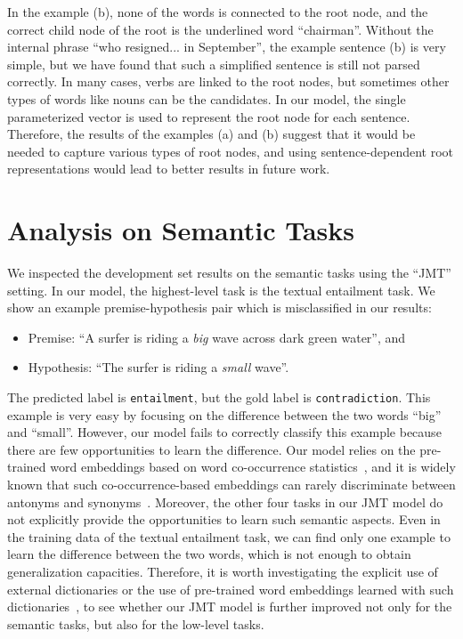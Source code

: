 \documentclass[11pt,a4paper]{article}
\begin{document}
In the example (b), none of the words is connected to the root node, and the correct child node of the root is the underlined word ``chairman''.
Without the internal phrase ``who resigned... in September'', the example sentence (b) is very simple, but we have found that such a simplified sentence is still not parsed correctly.
In many cases, verbs are linked to the root nodes, but sometimes other types of words like nouns can be the candidates.
In our model, the single parameterized vector  is used to represent the root node for each sentence.
Therefore, the results of the examples (a) and (b) suggest that it would be needed to capture various types of root nodes, and using sentence-dependent root representations would lead to better results in future work.

\section{Analysis on Semantic Tasks}
\label{sec:sem_analysis}

We inspected the development set results on the semantic tasks using the ``JMT'' setting.
In our model, the highest-level task is the textual entailment task.
We show an example premise-hypothesis pair which is misclassified in our results:
\begin{itemize}
\item[] Premise: ``A surfer is riding a {\it big} wave across dark green water'', and
\item[] Hypothesis: ``The surfer is riding a {\it small} wave''.
\end{itemize}
The predicted label is {\tt entailment}, but the gold label is {\tt contradiction}.
This example is very easy by focusing on the difference between the two words ``big'' and ``small''.
However, our model fails to correctly classify this example because there are few opportunities to learn the difference.
Our model relies on the pre-trained word embeddings based on word co-occurrence statistics~\citep{mikolov2013word2vec}, and it is widely known that such co-occurrence-based embeddings can rarely discriminate between antonyms and synonyms~\citep{ono2015ant}.
Moreover, the other four tasks in our JMT model do not explicitly provide the opportunities to learn such semantic aspects.
Even in the training data of the textual entailment task, we can find only one example to learn the difference between the two words, which is not enough to obtain generalization capacities.
Therefore, it is worth investigating the explicit use of external dictionaries or the use of pre-trained word embeddings learned with such dictionaries~\citep{ono2015ant}, to see whether our JMT model is further improved not only for the semantic tasks, but also for the low-level tasks.
\end{document}
